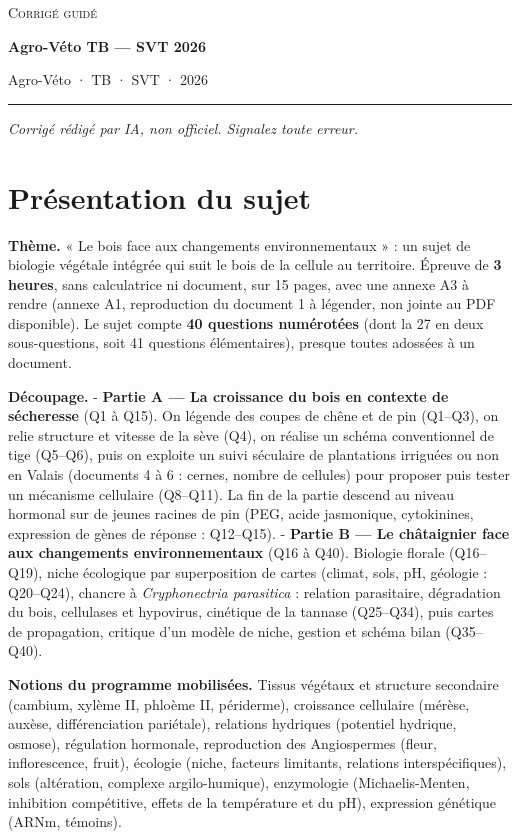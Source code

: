 \documentclass[11pt,a4paper]{article}
\begin{document}
\thispagestyle{plain}
\begin{center}
  {\small\scshape Corrigé guidé}\par\smallskip
  {\LARGE\bfseries Agro-Véto TB — SVT 2026\par}\medskip
  {\large Agro-Véto · TB · SVT · 2026\par}
\end{center}
\vspace{2pt}\hrule\vspace{8pt}

\emph{Corrigé rédigé par IA, non officiel. Signalez toute erreur.}

\hypertarget{pruxe9sentation-du-sujet}{%
\section{Présentation du sujet}\label{pruxe9sentation-du-sujet}}

\textbf{Thème.} « Le bois face aux changements environnementaux » : un sujet de biologie végétale intégrée qui suit le bois de la cellule au territoire. Épreuve de \textbf{3 heures}, sans calculatrice ni document, sur 15 pages, avec une annexe A3 à rendre (annexe A1, reproduction du document 1 à légender, non jointe au PDF disponible). Le sujet compte \textbf{40 questions numérotées} (dont la 27 en deux sous-questions, soit 41 questions élémentaires), presque toutes adossées à un document.

\textbf{Découpage.}
- \textbf{Partie A --- La croissance du bois en contexte de sécheresse} (Q1 à Q15). On légende des coupes de chêne et de pin (Q1--Q3), on relie structure et vitesse de la sève (Q4), on réalise un schéma conventionnel de tige (Q5--Q6), puis on exploite un suivi séculaire de plantations irriguées ou non en Valais (documents 4 à 6 : cernes, nombre de cellules) pour proposer puis tester un mécanisme cellulaire (Q8--Q11). La fin de la partie descend au niveau hormonal sur de jeunes racines de pin (PEG, acide jasmonique, cytokinines, expression de gènes de réponse : Q12--Q15).
- \textbf{Partie B --- Le châtaignier face aux changements environnementaux} (Q16 à Q40). Biologie florale (Q16--Q19), niche écologique par superposition de cartes (climat, sols, pH, géologie : Q20--Q24), chancre à \emph{Cryphonectria parasitica} : relation parasitaire, dégradation du bois, cellulases et hypovirus, cinétique de la tannase (Q25--Q34), puis cartes de propagation, critique d'un modèle de niche, gestion et schéma bilan (Q35--Q40).

\textbf{Notions du programme mobilisées.} Tissus végétaux et structure secondaire (cambium, xylème II, phloème II, périderme), croissance cellulaire (mérèse, auxèse, différenciation pariétale), relations hydriques (potentiel hydrique, osmose), régulation hormonale, reproduction des Angiospermes (fleur, inflorescence, fruit), écologie (niche, facteurs limitants, relations interspécifiques), sols (altération, complexe argilo-humique), enzymologie (Michaelis-Menten, inhibition compétitive, effets de la température et du pH), expression génétique (ARNm, témoins).
\end{document}
